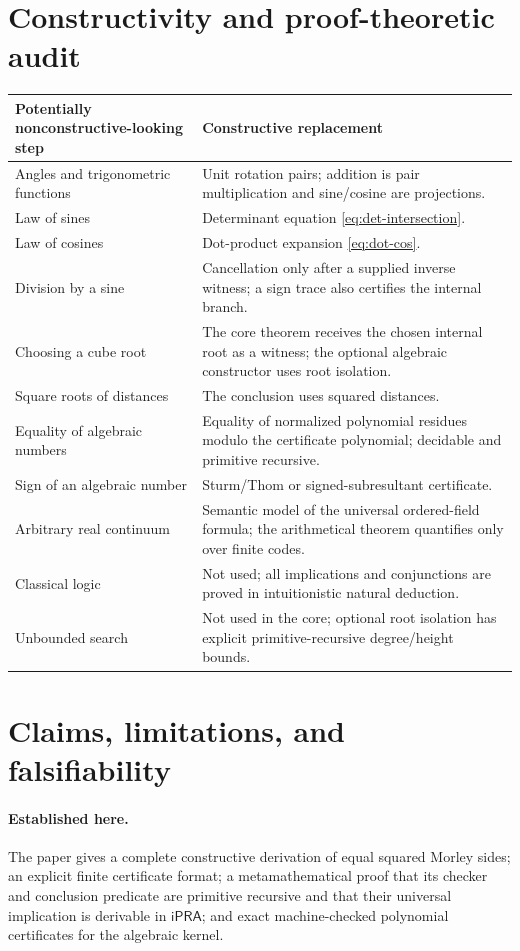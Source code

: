\documentclass[11pt]{article}
\theoremstyle{definition}
\newcommand{\iPRA}{\mathsf{iPRA}}
\begin{document}
\section{Constructivity and proof-theoretic audit}

\begin{longtable}{>{\raggedright\arraybackslash}p{}>{\raggedright\arraybackslash}p{}}
\toprule
Potentially nonconstructive-looking step & Constructive replacement \\
\midrule
\endhead
Angles and trigonometric functions & Unit rotation pairs; addition is pair
multiplication and sine/cosine are projections. \\
Law of sines & Determinant equation \eqref{eq:det-intersection}. \\
Law of cosines & Dot-product expansion \eqref{eq:dot-cos}. \\
Division by a sine & Cancellation only after a supplied inverse witness; a sign trace also certifies the internal branch. \\
Choosing a cube root & The core theorem receives the chosen internal root as a
witness; the optional algebraic constructor uses root isolation. \\
Square roots of distances & The conclusion uses squared distances. \\
Equality of algebraic numbers & Equality of normalized polynomial residues modulo the certificate polynomial; decidable and primitive recursive. \\
Sign of an algebraic number & Sturm/Thom or signed-subresultant certificate. \\
Arbitrary real continuum & Semantic model of the universal ordered-field
formula; the arithmetical theorem quantifies only over finite codes. \\
Classical logic & Not used; all implications and conjunctions are proved in
intuitionistic natural deduction. \\
Unbounded search & Not used in the core; optional root isolation has explicit
primitive-recursive degree/height bounds. \\
\bottomrule
\end{longtable}

\section{Claims, limitations, and falsifiability}

\paragraph{Established here.}
The paper gives a complete constructive derivation of equal squared Morley
sides; an explicit finite certificate format; a metamathematical proof that its
checker and conclusion predicate are primitive recursive and that their
universal implication is derivable in $\iPRA$; and exact machine-checked
polynomial certificates for the algebraic kernel.
\end{document}
